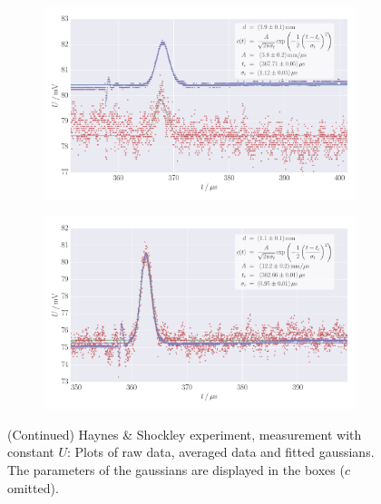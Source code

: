 \begin{figure}
    \centering
    \begin{subfigure}[b]{\pltw}
        \includegraphics[width=1.0\linewidth]{figures/haynes_shockley_raw_26}
        \caption{}
        \label{fig:h_s_raw_26}
    \end{subfigure}
    \begin{subfigure}[b]{\pltw}
        \includegraphics[width=1.0\linewidth]{figures/haynes_shockley_raw_33}
        \caption{}
        \label{fig:h_s_raw_33}
    \end{subfigure}
    \caption{
        (Continued)
        Haynes \& Shockley experiment, measurement with constant $U$:
        Plots of raw data, averaged data and fitted gaussians. 
        The parameters of the gaussians are displayed in the boxes 
        ($c$ omitted).
        }
    \label{fig:h_s_raw_plots_26_33}
\end{figure}
\label{sec:appendix_h_s_plots_U}
